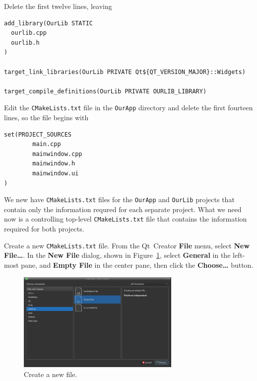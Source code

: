 \documentclass[letterpaper]{article}
\begin{document}
  Delete the first twelve lines, leaving
  \begin{lstlisting}
add_library(OurLib STATIC
  ourlib.cpp
  ourlib.h
)

target_link_libraries(OurLib PRIVATE Qt${QT_VERSION_MAJOR}::Widgets)

target_compile_definitions(OurLib PRIVATE OURLIB_LIBRARY)
  \end{lstlisting}

  Edit the \verb|CMakeLists.txt| file in the \verb|OurApp| directory and delete the first
  fourteen lines, so the file begins with
  \begin{lstlisting}
set(PROJECT_SOURCES
        main.cpp
        mainwindow.cpp
        mainwindow.h
        mainwindow.ui
)
  \end{lstlisting}

  We new have \verb|CMakeLists.txt| files for the \verb|OurApp| and \verb|OurLib| projects
  that contain only the information requred for each separate project. What we need now is
  a controlling top-level \verb|CMakeLists.txt| file that contains the information required
  for both projects.

  Create a new \verb|CMakeLists.txt| file. From the Qt~Creator \textbf{File} menu,
  select \textbf{New File\ldots}. In the \textbf{New File} dialog, shown in
  Figure~\ref{fig:new_txt_file}, select \textbf{General} in the left-most pane,
  and \textbf{Empty File} in the center pane, then click the \textbf{Choose\ldots}
  button.
  \begin{figure}[H]
    \centering
    \includegraphics[width=0.7\textwidth]{new_txt_file.png}
    \caption{Create a new file.}
    \label{fig:new_txt_file}
  \end{figure}
\end{document}

